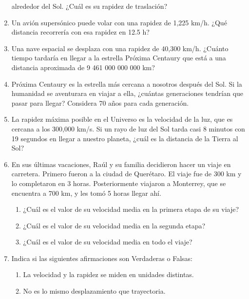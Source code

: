 \documentclass[11pt]{book}
\begin{document}
\begin{enumerate}
        alrededor del Sol. ¿Cuál es su rapidez de traslación?
  \item Un avión supersónico puede volar con una rapidez de 1,225 km/h. ¿Qué distancia recorrería
        con esa rapidez en 12.5 h?
  \item Una nave espacial se desplaza con una rapidez de 40,300 km/h. ¿Cuánto tiempo tardaría en
        llegar a la estrella Próxima Centaury que está a una distancia aproximada de 9 461 000 000 000 km?
  \item Próxima Centaury es la estrella más cercana a nosotros después del Sol.
        Si la humanidad se aventurara en viajar a ella, ¿cuántas generaciones tendrían
        que pasar para llegar? Considera 70 años para cada generación.
  \item La rapidez máxima posible en el Universo es la velocidad de la luz, que es cercana a
        los 300,000 km/s. Si un rayo de luz del Sol tarda casi 8 minutos con 19 segundos
        en llegar a nuestro planeta, ¿cuál es la distancia de la Tierra al Sol?
  \item En sus últimas vacaciones, Raúl y su familia decidieron hacer un viaje en carretera. Primero fueron a la ciudad de Querétaro. El viaje fue de 300 km y lo completaron en 3 horas. Posteriormente viajaron a Monterrey, que se encuentra a 700 km, y les tomó 5 horas llegar ahí.
        \begin{enumerate}
          \item ¿Cuál es el valor de su velocidad media en la primera etapa de su viaje?
          \item ¿Cuál es el valor de su velocidad media en la segunda etapa?
          \item ¿Cuál es el valor de su velocidad media en todo el viaje?
        \end{enumerate}
  \item Indica si las siguientes afirmaciones son Verdaderas o Falsas:
        \begin{enumerate}
          \item La velocidad y la rapidez se miden en unidades distintas.\\
          \item No es lo mismo desplazamiento que trayectoria.\\

\end{enumerate}
\end{enumerate}
\end{document}
